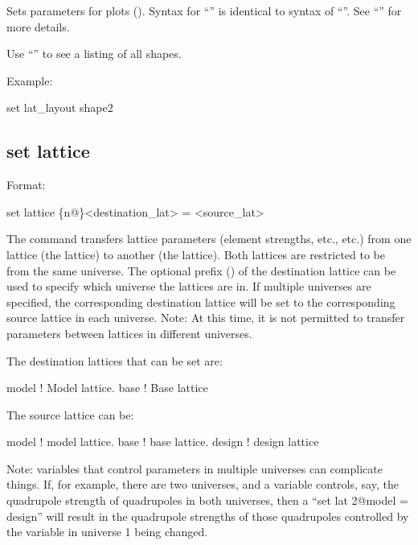 {{Sets parameters for  plots ().  Syntax for
``'' is identical to syntax of ``''.  See ``'' for more details.

Use ``'' to see a listing of all shapes. 

Example:
\begin{example}
  set lat_layout shape2%
\end{example}


\subsection{set lattice}
\label{s:set.lattice}

Format:
\begin{example}
  set lattice \{n@\}<destination_lat> = <source_lat>
\end{example}

The  command transfers lattice parameters (element strengths, etc., etc.)
from one lattice (the  lattice) to another (the  lattice). Both
lattices are restricted to be from the same universe. The optional  prefix
() of the destination lattice can be used to specify which universe the
lattices are in. If multiple universes are specified, the corresponding destination
lattice will be set to the corresponding source lattice in each universe. Note: At this
time, it is not permitted to transfer parameters between lattices in different universes.

The destination lattices that can be set are:
\begin{example}
  model      ! Model lattice.
  base       ! Base lattice
\end{example}
The source lattice can be:
\begin{example}
  model       ! model lattice.
  base        ! base lattice.
  design      ! design lattice
\end{example}

Note: \tao variables that control parameters in multiple universes can complicate
things. If, for example, there are two universes, and a \tao variable controls, say, the
quadrupole strength of quadrupoles in both universes, then a ``set lat 2@model = design''
will result in the quadrupole strengths of those quadrupoles controlled by the variable in
universe 1 being changed.

}}
